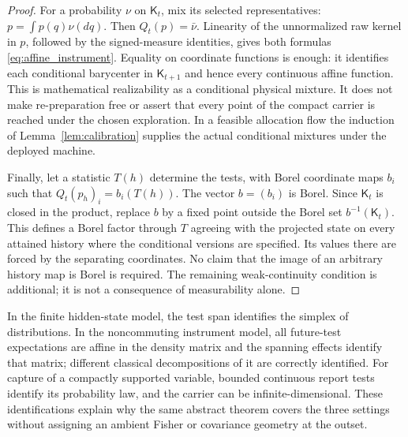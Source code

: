 \begin{proof}
For a probability $\nu$ on $\mathsf K_t$, mix its selected representatives: $p=\int p(q)\nu(dq)$. Then $Q_t(p)=\bar\nu$. Linearity of the unnormalized raw kernel in $p$, followed by the signed-measure identities, gives both formulas \eqref{eq:affine_instrument}. Equality on coordinate functions is enough: it identifies each conditional barycenter in $\mathsf K_{t+1}$ and hence every continuous affine function. This is mathematical realizability as a conditional physical mixture. It does not make re-preparation free or assert that every point of the compact carrier is reached under the chosen exploration. In a feasible allocation flow the induction of Lemma~\ref{lem:calibration} supplies the actual conditional mixtures under the deployed machine.

Finally, let a statistic $T(h)$ determine the tests, with Borel coordinate maps $b_i$ such that $Q_t(p_h)_i=b_i(T(h))$. The vector $b=(b_i)$ is Borel. Since $\mathsf K_t$ is closed in the product, replace $b$ by a fixed point outside the Borel set $b^{-1}(\mathsf K_t)$. This defines a Borel factor through $T$ agreeing with the projected state on every attained history where the conditional versions are specified. Its values there are forced by the separating coordinates. No claim that the image of an arbitrary history map is Borel is required. The remaining weak-continuity condition is additional; it is not a consequence of measurability alone.
\end{proof}
In the finite hidden-state model, the test span identifies the simplex of distributions. In the noncommuting instrument model, all future-test expectations are affine in the density matrix and the spanning effects identify that matrix; different classical decompositions of it are correctly identified. For capture of a compactly supported variable, bounded continuous report tests identify its probability law, and the carrier can be infinite-dimensional. These identifications explain why the same abstract theorem covers the three settings without assigning an ambient Fisher or covariance geometry at the outset.
